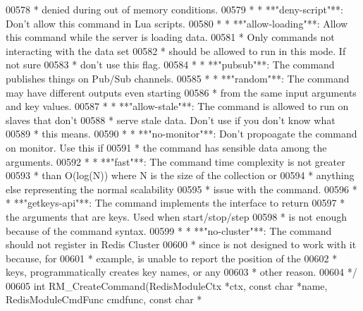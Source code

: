 \begin{DoxyCode}
{00578 \textcolor{comment}{ *                    denied during out of memory conditions.}
00579 \textcolor{comment}{ * * **"deny-script"**:   Don't allow this command in Lua scripts.}
00580 \textcolor{comment}{ * * **"allow-loading"**: Allow this command while the server is loading data.}
00581 \textcolor{comment}{ *                        Only commands not interacting with the data set}
00582 \textcolor{comment}{ *                        should be allowed to run in this mode. If not sure}
00583 \textcolor{comment}{ *                        don't use this flag.}
00584 \textcolor{comment}{ * * **"pubsub"**:    The command publishes things on Pub/Sub channels.}
00585 \textcolor{comment}{ * * **"random"**:    The command may have different outputs even starting}
00586 \textcolor{comment}{ *                    from the same input arguments and key values.}
00587 \textcolor{comment}{ * * **"allow-stale"**: The command is allowed to run on slaves that don't}
00588 \textcolor{comment}{ *                      serve stale data. Don't use if you don't know what}
00589 \textcolor{comment}{ *                      this means.}
00590 \textcolor{comment}{ * * **"no-monitor"**: Don't propoagate the command on monitor. Use this if}
00591 \textcolor{comment}{ *                     the command has sensible data among the arguments.}
00592 \textcolor{comment}{ * * **"fast"**:      The command time complexity is not greater}
00593 \textcolor{comment}{ *                    than O(log(N)) where N is the size of the collection or}
00594 \textcolor{comment}{ *                    anything else representing the normal scalability}
00595 \textcolor{comment}{ *                    issue with the command.}
00596 \textcolor{comment}{ * * **"getkeys-api"**: The command implements the interface to return}
00597 \textcolor{comment}{ *                      the arguments that are keys. Used when start/stop/step}
00598 \textcolor{comment}{ *                      is not enough because of the command syntax.}
00599 \textcolor{comment}{ * * **"no-cluster"**: The command should not register in Redis Cluster}
00600 \textcolor{comment}{ *                     since is not designed to work with it because, for}
00601 \textcolor{comment}{ *                     example, is unable to report the position of the}
00602 \textcolor{comment}{ *                     keys, programmatically creates key names, or any}
00603 \textcolor{comment}{ *                     other reason.}
00604 \textcolor{comment}{ */}
00605 \textcolor{keywordtype}{int} RM\_CreateCommand(RedisModuleCtx *ctx, \textcolor{keyword}{const} \textcolor{keywordtype}{char} *name, RedisModuleCmdFunc cmdfunc, \textcolor{keyword}{const} \textcolor{keywordtype}{char} *
}
\end{DoxyCode}
